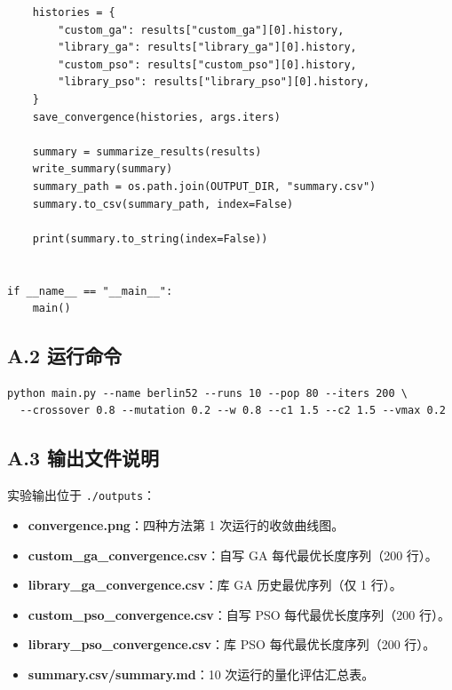 \documentclass[runningheads]{ctexart}
\begin{document}
\begin{lstlisting}
    histories = {
        "custom_ga": results["custom_ga"][0].history,
        "library_ga": results["library_ga"][0].history,
        "custom_pso": results["custom_pso"][0].history,
        "library_pso": results["library_pso"][0].history,
    }
    save_convergence(histories, args.iters)

    summary = summarize_results(results)
    write_summary(summary)
    summary_path = os.path.join(OUTPUT_DIR, "summary.csv")
    summary.to_csv(summary_path, index=False)

    print(summary.to_string(index=False))


if __name__ == "__main__":
    main()

\end{lstlisting}

\subsection*{A.2 运行命令}
\begin{verbatim}
python main.py --name berlin52 --runs 10 --pop 80 --iters 200 \
  --crossover 0.8 --mutation 0.2 --w 0.8 --c1 1.5 --c2 1.5 --vmax 0.2
\end{verbatim}

\subsection*{A.3 输出文件说明}
实验输出位于 \texttt{./outputs}：
\begin{itemize}
	\item \textbf{convergence.png}：四种方法第 1 次运行的收敛曲线图。
	\item \textbf{custom\_ga\_convergence.csv}：自写 GA 每代最优长度序列（200 行）。
	\item \textbf{library\_ga\_convergence.csv}：库 GA 历史最优序列（仅 1 行）。
	\item \textbf{custom\_pso\_convergence.csv}：自写 PSO 每代最优长度序列（200 行）。
	\item \textbf{library\_pso\_convergence.csv}：库 PSO 每代最优长度序列（200 行）。
	\item \textbf{summary.csv/summary.md}：10 次运行的量化评估汇总表。
\end{itemize}
\end{document}
